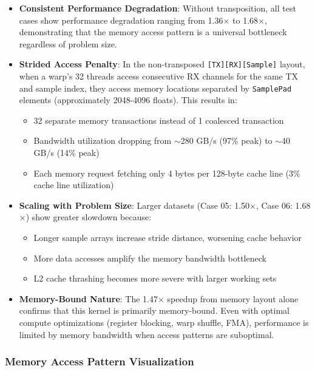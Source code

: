 \documentclass{article}
\begin{document}
\begin{itemize}
    \item \textbf{Consistent Performance Degradation}: Without transposition, all test cases show performance degradation ranging from 1.36$\times$ to 1.68$\times$, demonstrating that the memory access pattern is a universal bottleneck regardless of problem size.

    \item \textbf{Strided Access Penalty}: In the non-transposed \texttt{[TX][RX][Sample]} layout, when a warp's 32 threads access consecutive RX channels for the same TX and sample index, they access memory locations separated by \texttt{SamplePad} elements (approximately 2048-4096 floats). This results in:
    \begin{itemize}
        \item 32 separate memory transactions instead of 1 coalesced transaction
        \item Bandwidth utilization dropping from $\sim$280 GB/s (97\% peak) to $\sim$40 GB/s (14\% peak)
        \item Each memory request fetching only 4 bytes per 128-byte cache line (3\% cache line utilization)
    \end{itemize}

    \item \textbf{Scaling with Problem Size}: Larger datasets (Case 05: 1.50$\times$, Case 06: 1.68$\times$) show greater slowdown because:
    \begin{itemize}
        \item Longer sample arrays increase stride distance, worsening cache behavior
        \item More data accesses amplify the memory bandwidth bottleneck
        \item L2 cache thrashing becomes more severe with larger working sets
    \end{itemize}

    \item \textbf{Memory-Bound Nature}: The 1.47$\times$ speedup from memory layout alone confirms that this kernel is primarily memory-bound. Even with optimal compute optimizations (register blocking, warp shuffle, FMA), performance is limited by memory bandwidth when access patterns are suboptimal.
\end{itemize}

\subsubsection{Memory Access Pattern Visualization}
\end{document}
